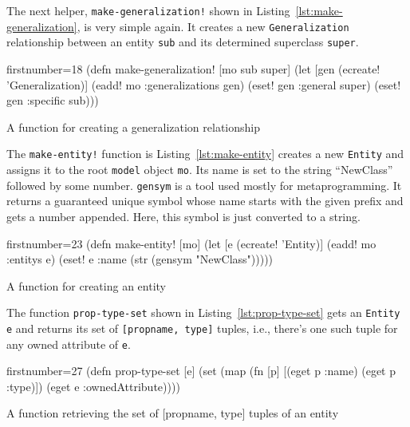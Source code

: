 \documentclass[11pt]{article}
\begin{document}
The next helper, \verb|make-generalization!| shown in
Listing~\ref{lst:make-generalization}, is very simple again.  It creates a new
\verb|Generalization| relationship between an entity \verb|sub| and its
determined superclass \verb|super|.

\begin{listing}[htbp]
  \begin{clojurecode*}{firstnumber=18}
(defn make-generalization! [mo sub super]
  (let [gen (ecreate! 'Generalization)]
    (eadd! mo :generalizations gen)
    (eset! gen :general super)
    (eset! gen :specific sub)))
  \end{clojurecode*}
  \caption{A function for creating a generalization relationship}
  \label{lst:make-generalization}
\end{listing}

The \verb|make-entity!| function is Listing~\ref{lst:make-entity} creates a new
\verb|Entity| and assigns it to the root \verb|model| object \verb|mo|.  Its
name is set to the string ``NewClass'' followed by some number.  \verb|gensym|
is a tool used mostly for metaprogramming.  It returns a guaranteed unique
symbol whose name starts with the given prefix and gets a number appended.
Here, this symbol is just converted to a string.

\begin{listing}[htbp]
  \begin{clojurecode*}{firstnumber=23}
(defn make-entity! [mo]
  (let [e (ecreate! 'Entity)]
    (eadd! mo :entitys e)
    (eset! e :name (str (gensym "NewClass")))))
  \end{clojurecode*}
  \caption{A function for creating an entity}
  \label{lst:make-entity}
\end{listing}

The function \verb|prop-type-set| shown in Listing~\ref{lst:prop-type-set} gets
an \verb|Entity e| and returns its set of \verb|[propname, type]| tuples, i.e.,
there's one such tuple for any owned attribute of \verb|e|.

\begin{listing}[h!tbp]
  \begin{clojurecode*}{firstnumber=27}
(defn prop-type-set [e]
  (set (map (fn [p] [(eget p :name) (eget p :type)])
            (eget e :ownedAttribute))))
  \end{clojurecode*}
  \caption{A function retrieving the set of \textsf{[propname, type]} tuples of
    an entity}
    \label{lst:prop-type-set}
\end{listing}
\end{document}
